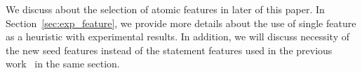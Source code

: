 We discuss about the selection of atomic features in later of this paper. In Section~\ref{sec:exp_feature}, we provide more details about the use of single feature as a heuristic with experimental results. In addition, we will discuss necessity of the new seed features instead of the statement features used in the previous work~\cite{JeJeChOh17} in the same section.
\begin{comment}
Table \ref{tbl:features} shows the atomic features used in our
model. We should learn tunneling abstraction as
precise as possible because approximation of $f_1 or f_2$ leads losing precision or
scalability. To learn desirable tunneling abstraction without approximation,
high qualitiy features are essential. \\
 We tried to reuse features from previous work, but we found that some
 features are too rough to learn good tunnel.



\begin{itemize}
\item{Table \ref{tbl:features} shows the atomic features used in our
model.}
\item{We should learn tunneling abstraction as
precise as possible as approximation of $f_1 or f_2$ leads losing precision or
scalability in this instance.}
\item{To learn desirable context tunneling abstractions, high quality
features are essential.}
\item{Our learning algorithm is very sensitive with features.}
\item{Features \#1$\sim$10 are from previous paper.}
\item{As previous Statement features
are too rough to learn desirable tunnel, we designed 13 specific
method features.}
\item{These features are maded with considering context
tunnelning.}
\item{For example feature \#22  is designed to avoid cost
    explosion. It indicates methods which are in class
    which contains more than 20 methods. }
\item{For example feature \#22  is designed to avoid cost
    explosion. It indicates methods which are in class
    which contains more than 20 methods. }
\item{Feature11 is dominant features for sobj, obj, type but learning
    gives much more desirable tunneling abstraction.}
\end{itemize}
\end{comment}

